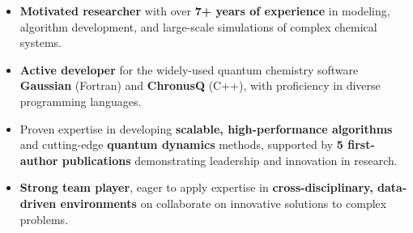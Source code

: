 

\begin{itemize}[label=$\bullet$] 

    \item\textbf{Motivated researcher} with over \textbf{7+ years of experience} in modeling, algorithm development, and large-scale simulations of complex chemical systems.

    \item \textbf{Active developer} for the widely-used quantum chemistry software \textbf{Gaussian} (Fortran) and \textbf{ChronusQ} (C++), with proficiency in diverse programming languages.
    
    \item Proven expertise in developing \textbf{scalable, high-performance algorithms} and cutting-edge \textbf{quantum dynamics} methods, supported by \textbf{5 first-author publications} demonstrating leadership and innovation in research.
    
    \item \textbf{Strong team player}, eager to apply expertise in \textbf{cross-disciplinary, data-driven environments} on collaborate on innovative solutions to complex problems.

\end{itemize}